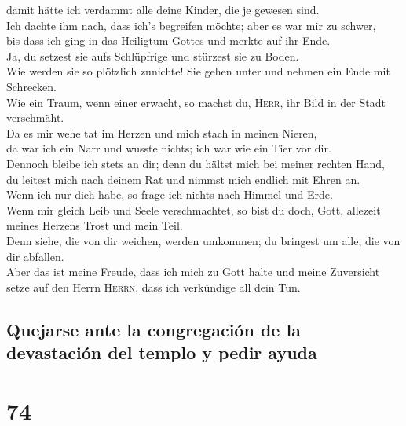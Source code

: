 damit hätte ich verdammt alle deine Kinder, die je gewesen sind.\\
 Ich dachte ihm nach, dass ich's begreifen möchte; aber
es war mir zu schwer,\\
 bis dass ich ging in das Heiligtum Gottes und merkte auf
ihr Ende.\\
 Ja, du setzest sie aufs Schlüpfrige und stürzest sie zu
Boden.\\
 Wie werden sie so plötzlich zunichte! Sie gehen unter
und nehmen ein Ende mit Schrecken.\\
 Wie ein Traum, wenn einer erwacht, so machst du,
\textsc{Herr}, ihr Bild in der Stadt verschmäht.\\
 Da es mir wehe tat im Herzen und mich stach in meinen
Nieren,\\
 da war ich ein Narr und wusste nichts; ich war wie ein
Tier vor dir.\\
 Dennoch bleibe ich stets an dir; denn du hältst mich bei
meiner rechten Hand,\\
 du leitest mich nach deinem Rat und nimmst mich endlich
mit Ehren an.\\
 Wenn ich nur dich habe, so frage ich nichts nach Himmel
und Erde.\\
 Wenn mir gleich Leib und Seele verschmachtet, so bist du
doch, Gott, allezeit meines Herzens Trost und mein Teil.\\
 Denn siehe, die von dir weichen, werden umkommen; du
bringest um alle, die von dir abfallen.\\
 Aber das ist meine Freude, dass ich mich zu Gott halte
und meine Zuversicht setze auf den Herrn \textsc{Herrn}, dass ich
verkündige all dein Tun.

\hypertarget{quejarse-ante-la-congregaciuxf3n-de-la-devastaciuxf3n-del-templo-y-pedir-ayuda}{%
\subsection{Quejarse ante la congregación de la devastación del templo y
pedir
ayuda}\label{quejarse-ante-la-congregaciuxf3n-de-la-devastaciuxf3n-del-templo-y-pedir-ayuda}}

\hypertarget{section-73}{%
\section{74}\label{section-73}}


